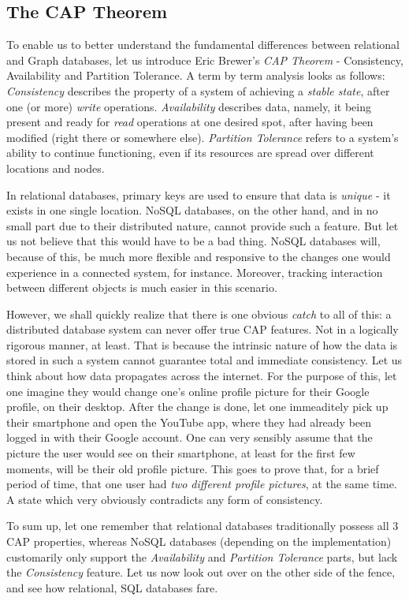 \documentclass[10pt,        %
               a4paper,     %
               journal,     %
               ]{IEEEtran}
\begin{document}
\subsection{The CAP Theorem}
To enable us to better understand the fundamental differences between relational and Graph databases, let us introduce Eric Brewer's \textit{CAP Theorem} - Consistency, Availability and Partition Tolerance. \cite{brewer_cap_theorem} A term by term analysis looks as follows: \textit{Consistency} describes the property of a system of achieving a \textit{stable state}, after one (or more) \textit{write} operations. \textit{Availability} describes data, namely, it being present and ready for \textit{read} operations at one desired spot, after having been modified (right there or somewhere else). \textit{Partition Tolerance} refers to a system's ability to continue functioning, even if its resources are spread over different locations and nodes. \par
In relational databases, primary keys are used to ensure that data is \textit{unique} - it exists in one single location. NoSQL databases, on the other hand, and in no small part due to their distributed nature, cannot provide such a feature. But let us not believe that this would have to be a bad thing. NoSQL databases will, because of this, be much more flexible and responsive to the changes one would experience in a connected system, for instance. Moreover, tracking interaction between different objects is much easier in this scenario. \par
However, we shall quickly realize that there is one obvious \textit{catch} to all of this: a distributed database system can never offer true CAP features. Not in a logically rigorous manner, at least. That is because the intrinsic nature of how the data is stored in such a system cannot guarantee total and immediate consistency. Let us think about how data propagates across the internet. For the purpose of this, let one imagine they would change one's online profile picture for their Google profile, on their desktop. After the change is done, let one immeaditely pick up their smartphone and open the YouTube app, where they had already been logged in with their Google account. One can very sensibly assume that the picture the user would see on their smartphone, at least for the first few moments, will be their old profile picture. This goes to prove that, for a brief period of time, that one user had \textit{two different profile pictures}, at the same time. A state which very obviously contradicts any form of consistency. \par
To sum up, let one remember that relational databases traditionally possess all 3 CAP properties, whereas NoSQL databases (depending on the implementation) customarily only support the \textit{Availability} and \textit{Partition Tolerance} parts, but lack the \textit{Consistency} feature. Let us now look out over on the other side of the fence, and see how relational, SQL databases fare. \par
\end{document}
